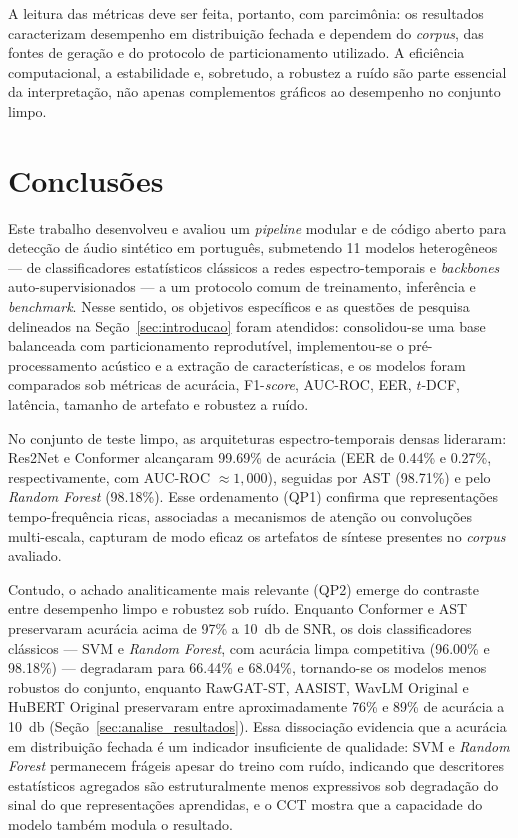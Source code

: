 \documentclass[12pt,a4paper]{article}
\begin{document}
A leitura das métricas deve ser feita, portanto, com parcimônia: os resultados
caracterizam desempenho em distribuição fechada e dependem do \textit{corpus},
das fontes de geração e do protocolo de particionamento utilizado. A eficiência
computacional, a estabilidade e, sobretudo, a robustez a ruído são parte
essencial da interpretação, não apenas complementos gráficos ao desempenho no
conjunto limpo.




\section{Conclusões}
\label{sec:conclusao}

Este trabalho desenvolveu e avaliou um \textit{pipeline} modular e de código
aberto para detecção de áudio sintético em português, submetendo \num{11}
modelos heterogêneos --- de classificadores estatísticos clássicos a redes
espectro-temporais e \textit{backbones} auto-supervisionados --- a um protocolo
comum de treinamento, inferência e \textit{benchmark}. Nesse sentido, os
objetivos específicos e as questões de pesquisa delineados na
Seção~\ref{sec:introducao} foram atendidos:
consolidou-se uma base balanceada com particionamento reprodutível,
implementou-se o pré-processamento acústico e a extração de características, e
os modelos foram comparados sob métricas de acurácia, F1-\textit{score},
AUC-ROC, EER, $t$-DCF, latência, tamanho de artefato e robustez a ruído.

No conjunto de teste limpo, as arquiteturas espectro-temporais densas
lideraram: Res2Net e Conformer alcançaram \num{99,69}\% de acurácia
(EER de \num{0,44}\% e \num{0,27}\%, respectivamente, com AUC-ROC
$\approx 1{,}000$), seguidas por AST (\num{98,71}\%) e pelo \textit{Random
Forest} (\num{98,18}\%). Esse ordenamento (QP1) confirma que representações
tempo-frequência ricas, associadas a mecanismos de atenção ou convoluções
multi-escala, capturam de modo eficaz os artefatos de síntese presentes no
\textit{corpus} avaliado.

Contudo, o achado analiticamente mais relevante (QP2) emerge do contraste
entre desempenho limpo e robustez sob ruído. Enquanto Conformer e AST
preservaram acurácia acima de \num{97}\% a \SI{10}{\decibel} de SNR, os dois
classificadores clássicos --- SVM e \textit{Random Forest}, com acurácia limpa
competitiva (\num{96,00}\% e \num{98,18}\%) --- degradaram para \num{66,44}\%
e \num{68,04}\%, tornando-se os modelos menos robustos do conjunto, enquanto
RawGAT-ST, AASIST, WavLM Original e HuBERT Original preservaram entre
aproximadamente \num{76}\% e \num{89}\% de acurácia a \SI{10}{\decibel}
(Seção~\ref{sec:analise_resultados}). Essa dissociação evidencia que a
acurácia em distribuição fechada é um indicador insuficiente de qualidade:
SVM e \textit{Random Forest} permanecem frágeis apesar do treino com ruído,
indicando que descritores estatísticos agregados são estruturalmente menos
expressivos sob degradação do sinal do que representações aprendidas, e o
CCT mostra que a capacidade do modelo também modula o resultado.
\end{document}
